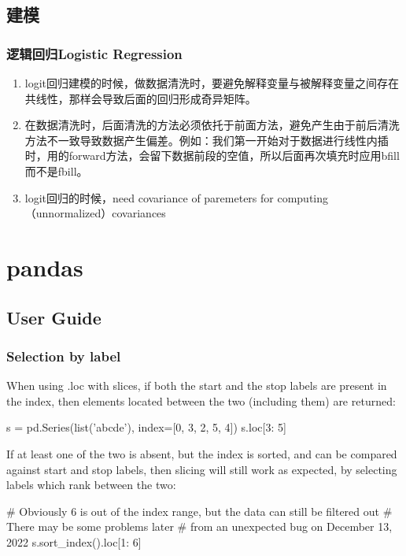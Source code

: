 \documentclass[openany]{book}
\begin{document}
\chapter{建模}
\section{逻辑回归Logistic Regression}
\begin{enumerate}
    \item logit回归建模的时候，做数据清洗时，要避免解释变量与被解释变量之间存在共线性，那样会导致后面的回归形成奇异矩阵。
    \item 在数据清洗时，后面清洗的方法必须依托于前面方法，避免产生由于前后清洗方法不一致导致数据产生偏差。例如：我们第一开始对于数据进行线性内插时，用的forward方法，会留下数据前段的空值，所以后面再次填充时应用bfill而不是fbill。
    \item logit回归的时候，need covariance of paremeters for computing（unnormalized）covariances
\end{enumerate}
\part{pandas}
\chapter{User Guide}
\section{Selection by label}
When using .loc with slices, if both the start and the stop labels are present in the index, then elements located between the two (including them) are returned:
\begin{pyc}
s = pd.Series(list('abcde'), index=[0, 3, 2, 5, 4])
s.loc[3: 5]
\end{pyc}

If at least one of the two is absent, but the index is sorted, and can be compared against start and stop labels, then slicing will still work as expected, by selecting labels which rank between the two:

\begin{pyc}
# Obviously 6 is out of the index range, but the data can still be filtered out
# There may be some problems later
# from an unexpected bug on December 13, 2022
s.sort_index().loc[1: 6]
\end{pyc}
\end{document}
